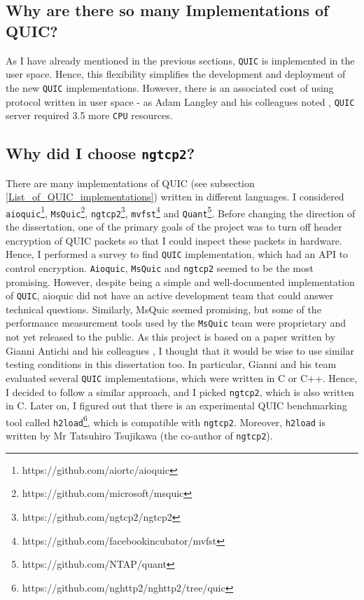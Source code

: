 \documentclass[12pt,a4paper,twoside,openright]{report}
\begin{document}
\subsection{Why are there so many Implementations of QUIC?}

As I have already mentioned in the previous sections, \texttt{QUIC} is implemented in the user space.
Hence, this flexibility simplifies the development and deployment of the new \texttt{QUIC} implementations.
However, there is an associated cost of using protocol written in user space - as Adam Langley and his colleagues noted \cite{QUIC_SERVER_REQUIRES_3-5_more_CPU_resources}, \texttt{QUIC} server required 3.5 more \texttt{CPU} resources.

\subsection{Why did I choose  \texttt{ngtcp2}?}
There are many implementations of QUIC (see subsection \ref{List_of_QUIC_implementations}) written in different languages.
I considered  \texttt{aioquic}\footnote{https://github.com/aiortc/aioquic},  \texttt{MsQuic}\footnote{https://github.com/microsoft/msquic},  \texttt{ngtcp2}\footnote{https://github.com/ngtcp2/ngtcp2},  \texttt{mvfst}\footnote{https://github.com/facebookincubator/mvfst} and \texttt{Quant}\footnote{https://github.com/NTAP/quant}.
Before changing the direction of the dissertation, one of the primary goals of the project was to turn off header encryption of QUIC packets so that I could inspect these packets in hardware.
Hence, I performed a survey to find \texttt{QUIC} implementation, which had an API to control encryption. 
\texttt{Aioquic}, \texttt{MsQuic} and \texttt{ngtcp2} seemed to be the most promising.
However, despite being a simple and well-documented implementation of \texttt{QUIC}, aioquic did not have an active development team that could answer technical questions.
Similarly, MsQuic seemed promising, but some of the performance measurement tools used by the \texttt{MsQuic} team were proprietary and not yet released to the public.
As this project is based on a paper written by Gianni Antichi and his colleagues \cite{Making_QUIC_Quicker}, I thought that it would be wise to use similar testing conditions in this dissertation too.
In particular, Gianni and his team evaluated several \texttt{QUIC} implementations, which were written in C or C++.
Hence, I decided to follow a similar approach, and I picked \texttt{ngtcp2}, which is also written in C.
Later on, I figured out that there is an experimental QUIC benchmarking tool called \texttt{h2load}\footnote{https://github.com/nghttp2/nghttp2/tree/quic}, which is compatible with \texttt{ngtcp2}.
Moreover, \texttt{h2load} is written by Mr Tatsuhiro  Tsujikawa (the co-author of \texttt{ngtcp2}).
\end{document}
